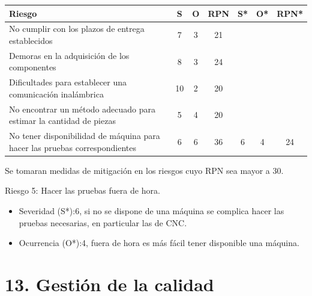 \documentclass[11pt]{charter}
\begin{document}
\begin{table}[htpb]
\centering
\begin{tabularx}{\linewidth}{@{}|X|c|c|c|c|c|c|@{}}
\hline
\rowcolor[HTML]{C0C0C0} 
Riesgo & S & O & RPN & S* & O* & RPN* \\ \hline
   No cumplir con los plazos de entrega establecidos   & 7  &  3 &  21   &    &    &      \\ \hline
   Demoras en la adquisición de los componentes  & 8  & 3  &    24 &    &    &      \\ \hline
   Dificultades para establecer una comunicación inalámbrica   & 10  & 2  & 20    &    &    &      \\ \hline
   No encontrar un método adecuado para estimar la cantidad de piezas  & 5  & 4  &   20  &    &    &      \\ \hline
     No tener disponibilidad de máquina para hacer las pruebas correspondientes  & 6  &  6 &    36 &  6  &  4  &   24   \\ \hline
\end{tabularx}%
\end{table}

Se tomaran medidas de mitigación en los riesgos cuyo RPN sea mayor a 30.

Riesgo 5: Hacer las pruebas fuera de hora.
\begin{itemize}
    \item Severidad (S*):6, si no se dispone de una máquina se complica hacer las pruebas necesarias, en particular las de CNC.
    \item Ocurrencia (O*):4, fuera de hora es más fácil tener disponible una máquina.
\end{itemize}

\section{13. Gestión de la calidad}
\label{sec:calidad}
\end{document}
